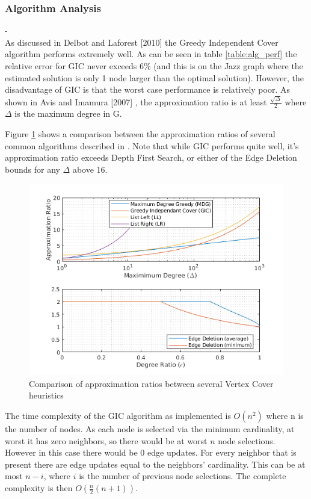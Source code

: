 \documentclass[acmlarge]{acmart}
\begin{document}
\subsubsection{Algorithm Analysis}\label{app_alg_analy}

-\\

As discussed in Delbot and Laforest [2010] \cite{Fran10} the Greedy Independent Cover algorithm performs extremely well. As can be seen in table \ref{table:alg_perf} the relative error for GIC never exceeds 6\% (and this is on the Jazz graph where the estimated solution is only 1 node larger than the optimal solution). However, the disadvantage of GIC is that the worst case performance is relatively poor. As shown in Avis and Imamura [2007] \cite{Avis06}, the approximation ratio is at least $\frac{\sqrt{\Delta}}{2}$ where $\Delta$ is the maximum degree in G.

Figure \ref{fig:approx_comp} shows a comparison between the approximation ratios of several common algorithms described in \cite{Fran10}. Note that while GIC performs quite well, it's approximation ratio exceeds Depth First Search, or either of the Edge Deletion bounds for any $\Delta$ above 16.

\begin{figure}[h]
	\centering
	\includegraphics[width=0.8\linewidth]{ApproxRatioComp.png}
	\caption{Comparison of approximation ratios between several Vertex Cover heuristics}
	\label{fig:approx_comp}
\end{figure}



The time complexity of the GIC algorithm as implemented is $O(n^2)$ where n is the number of nodes. As each node is selected via the minimum cardinality, at worst it has zero neighbors, so there would be at worst $n$ node selections. However in this case there would be 0 edge updates. For every neighbor that is present there are edge updates equal to the neighbors' cardinality. This can be at most $n-i$, where $i$ is the number of previous node selections. The complete complexity is then $O(\frac{n}{2}(n+1))$.
\end{document}
